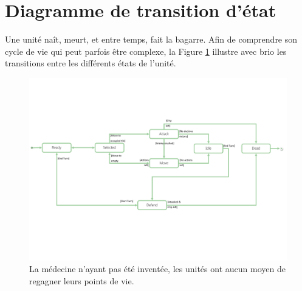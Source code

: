 \section{Diagramme de transition d'état}
	Une unité naît, meurt, et entre temps, fait la bagarre. Afin de comprendre son cycle de vie qui peut parfois être complexe, la Figure \ref{fig:transition_unit} illustre avec brio les transitions entre les différents états de l'unité.

	\begin{figure}[h!]
		\centering
		\includegraphics[width=1\textwidth]{figure/transition_unit.pdf}
		\caption{La médecine n'ayant pas été inventée, les unités ont aucun moyen de regagner leurs points de vie.}
		\label{fig:transition_unit}
	\end{figure}